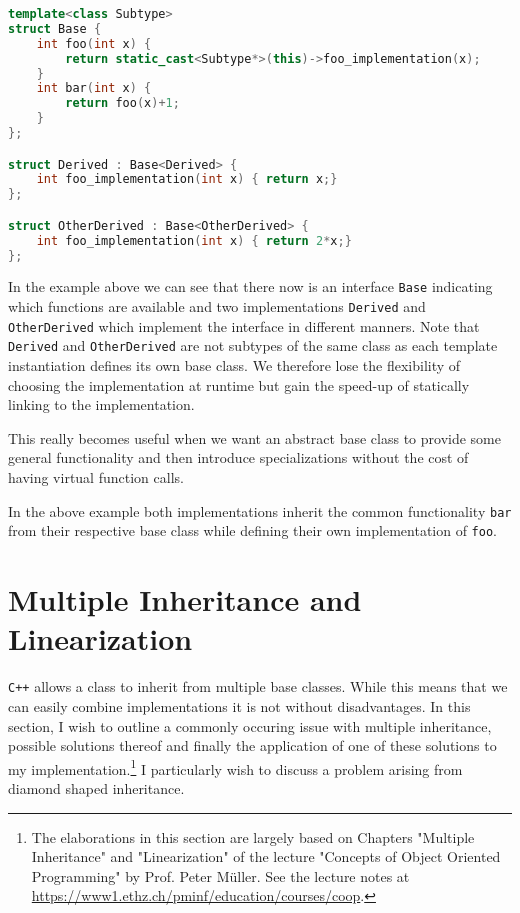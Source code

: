\begin{minipage}{\linewidth}
\begin{lstlisting}[language=C++]
template<class Subtype>
struct Base {
	int foo(int x) {
    	return static_cast<Subtype*>(this)->foo_implementation(x);
    }
    int bar(int x) {
    	return foo(x)+1;
    }
};

struct Derived : Base<Derived> {
	int foo_implementation(int x) { return x;}
};

struct OtherDerived : Base<OtherDerived> {
	int foo_implementation(int x) { return 2*x;}
};
\end{lstlisting}
\end{minipage}


In the example above we can see that there now is an interface \texttt{Base} indicating which functions are available and two implementations \texttt{Derived} and \texttt{OtherDerived} which implement the interface in different manners.
Note that \texttt{Derived} and \texttt{OtherDerived} are not subtypes of the same class as each template instantiation defines its own base class. We therefore lose the flexibility of choosing the implementation at runtime but gain the speed-up of statically linking to the implementation.

This really becomes useful when we want an abstract base class to provide some general functionality and then introduce specializations without the cost of having virtual function calls. 

In the above example both implementations inherit the common functionality \texttt{bar} from their respective base class while defining their own implementation of \texttt{foo}.

\section{Multiple Inheritance and Linearization}
\texttt{C++} allows a class to inherit from multiple base classes. While this means that we can easily combine implementations it is not without disadvantages. In this section, I wish to outline a commonly occuring issue with multiple inheritance, possible solutions thereof and finally the application of one of these solutions to my implementation.\footnote{The elaborations in this section are largely based on  Chapters "Multiple Inheritance" and "Linearization" of the  lecture "Concepts of Object Oriented Programming" by Prof. Peter M\"uller. See the lecture notes at \url{https://www1.ethz.ch/pminf/education/courses/coop}.} I particularly wish to discuss a problem arising from diamond shaped inheritance.
